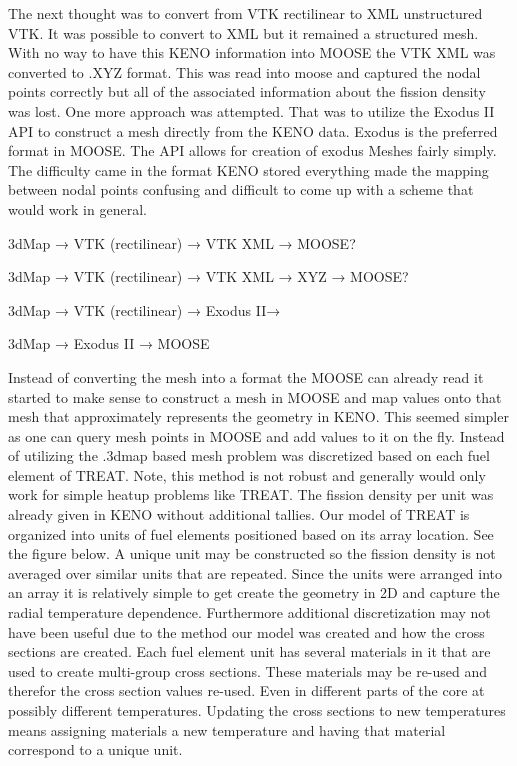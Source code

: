 \documentclass[11pt]{article}
\begin{document}
The next thought was to convert from VTK rectilinear to XML unstructured VTK.  It was possible to convert to XML but it remained a structured mesh.  With no way to have this KENO information into MOOSE the VTK XML was converted to .XYZ format.  This was read into moose and captured the nodal points correctly but all of the associated information about the fission density was lost. 
	One more approach was attempted. That was to utilize the Exodus II API to construct a mesh directly from the KENO data.  Exodus is the preferred format in MOOSE.  The API allows for creation of exodus Meshes fairly simply.  The difficulty came in the format KENO stored everything made the mapping between nodal points confusing and difficult to come up with a scheme that would work in general.  
	
3dMap → VTK (rectilinear) → VTK XML → MOOSE? 

3dMap → VTK (rectilinear) → VTK XML → XYZ → MOOSE?

3dMap → VTK (rectilinear) → Exodus II→

3dMap → Exodus II → MOOSE

Instead of converting the mesh into a format the MOOSE can already read it started to make sense to construct a mesh in MOOSE and map values onto that mesh that approximately represents the geometry in KENO.  This seemed simpler as one can query mesh points in MOOSE and add values to it on the fly.  Instead of utilizing the .3dmap based mesh problem was discretized based on each fuel element of TREAT.  Note, this method is not robust and generally would only work for simple heatup problems like TREAT.  The fission density per unit was already given in KENO without additional tallies.  Our model of TREAT is organized into units of fuel elements positioned based on its array location. See the figure below.  A unique unit may be constructed so the fission density is not averaged over similar units that are repeated.  Since the units were arranged into an array it is relatively simple to get create the geometry in 2D and capture the radial temperature dependence.  Furthermore additional discretization may not have been useful due to the method our model was created and how the cross sections are created.  Each fuel element unit has several materials in it that are used to create multi-group cross sections. These materials may be re-used and therefor the cross section values re-used.  Even in different parts of the core at possibly different temperatures.  Updating the cross sections to new temperatures means assigning materials a new temperature and having that material correspond to a unique unit.  
\end{document}
